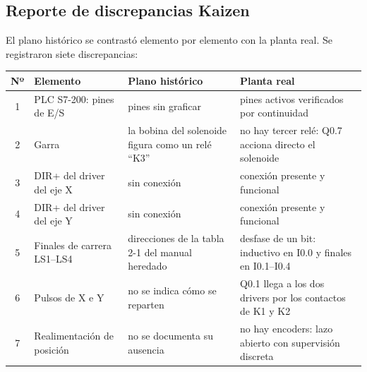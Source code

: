 \documentclass[a4paper,11pt]{article}
\begin{document}
\subsection{Reporte de discrepancias Kaizen}
El plano histórico se contrastó elemento por elemento con la planta real. Se registraron siete discrepancias:
\begin{center}\small
\begin{tabularx}{\linewidth}{c >{\raggedright}p{3.6cm} >{\raggedright}X >{\raggedright\arraybackslash}X}
\toprule
\textbf{Nº} & \textbf{Elemento} & \textbf{Plano histórico} & \textbf{Planta real}\\
\midrule
1 & PLC S7-200: pines de E/S & pines sin graficar & pines activos verificados por continuidad\\
2 & Garra & la bobina del solenoide figura como un relé ``K3'' & no hay tercer relé: Q0.7 acciona directo el solenoide\\
3 & DIR+ del driver del eje X & sin conexión & conexión presente y funcional\\
4 & DIR+ del driver del eje Y & sin conexión & conexión presente y funcional\\
5 & Finales de carrera LS1--LS4 & direcciones de la tabla 2-1 del manual heredado & desfase de un bit: inductivo en I0.0 y finales en I0.1--I0.4\\
6 & Pulsos de X e Y & no se indica cómo se reparten & Q0.1 llega a los dos drivers por los contactos de K1 y K2\\
7 & Realimentación de posición & no se documenta su ausencia & no hay encoders: lazo abierto con supervisión discreta\\
\bottomrule
\end{tabularx}
\end{center}
\end{document}
